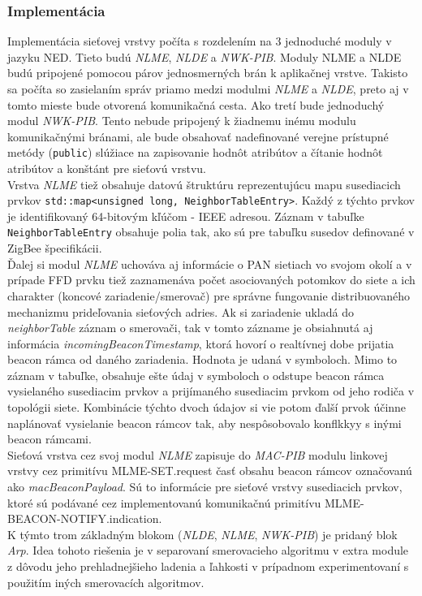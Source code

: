 \subsubsection{Implementácia}
\indent\indent Implementácia sieťovej vrstvy počíta s rozdelením na 3 jednoduché moduly v jazyku NED. Tieto budú \textit{NLME}, \textit{NLDE} a \textit{NWK-PIB}. Moduly NLME a NLDE budú pripojené pomocou párov jednosmerných brán k aplikačnej vrstve. Takisto sa počíta so zasielaním správ priamo medzi modulmi \textit{NLME} a \textit{NLDE}, preto aj v tomto mieste bude otvorená komunikačná cesta. Ako tretí bude jednoduchý modul \textit{NWK-PIB}. Tento nebude pripojený k žiadnemu inému modulu komunikačnými bránami, ale bude obsahovať nadefinované verejne prístupné metódy (\texttt{public}) slúžiace na zapisovanie hodnôt atribútov a čítanie hodnôt atribútov a konštánt pre sieťovú vrstvu.\\
\indent Vrstva \textit{NLME} tiež obsahuje datovú štruktúru reprezentujúcu mapu susediacich prvkov \texttt{std::map<unsigned long, NeighborTableEntry>}. Každý z týchto prvkov je identifikovaný 64-bitovým kľúčom - IEEE adresou. Záznam v tabuľke \texttt{NeighborTableEntry} obsahuje polia tak, ako sú pre tabuľku susedov definované v ZigBee špecifikácii.\\
\indent Ďalej si modul \textit{NLME} uchováva aj informácie o PAN sietiach vo svojom okolí a v prípade FFD prvku tiež zaznamenáva počet asociovaných potomkov do siete a ich charakter (koncové zariadenie/smerovač) pre správne fungovanie distribuovaného mechanizmu prideľovania sieťových adries. Ak si zariadenie ukladá do \textit{neighborTable} záznam o smerovači, tak v tomto zázname je obsiahnutá aj informácia \textit{incomingBeaconTimestamp}, ktorá hovorí o realtívnej dobe prijatia beacon rámca od daného zariadenia. Hodnota je udaná v symboloch. Mimo to záznam v tabuľke, obsahuje ešte údaj v symboloch o odstupe beacon rámca vysielaného susediacim prvkov a prijímaného susediacim prvkom od jeho rodiča v topológii siete. Kombinácie týchto dvoch údajov si vie potom ďalší prvok účinne naplánovať vysielanie beacon rámcov tak, aby nespôsobovalo konflkkyy s inými beacon rámcami.\\
\indent Sieťová vrstva cez svoj modul \textit{NLME} zapisuje do \textit{MAC-PIB} modulu linkovej vrstvy cez primitívu MLME-SET.request časť obsahu beacon rámcov označovanú ako \textit{macBeaconPayload}. Sú to informácie pre sieťové vrstvy susediacich prvkov, ktoré sú podávané cez implementovanú komunikačnú primitívu MLME-BEACON-NOTIFY.indication.\\
\indent K týmto trom základným blokom (\textit{NLDE}, \textit{NLME}, \textit{NWK-PIB}) je pridaný blok \textit{Arp}. Idea tohoto riešenia je v separovaní smerovacieho algoritmu v extra module z dôvodu jeho prehladnejšieho ladenia a ľahkosti v prípadnom experimentovaní s použitím iných smerovacích algoritmov.\\

